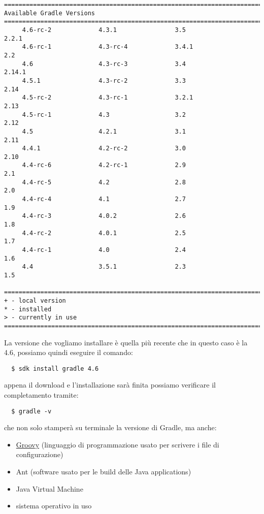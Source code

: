 \begin{verbatim}
================================================================================
Available Gradle Versions
================================================================================
     4.6-rc-2             4.3.1                3.5                  2.2.1          
     4.6-rc-1             4.3-rc-4             3.4.1                2.2            
     4.6                  4.3-rc-3             3.4                  2.14.1         
     4.5.1                4.3-rc-2             3.3                  2.14           
     4.5-rc-2             4.3-rc-1             3.2.1                2.13           
     4.5-rc-1             4.3                  3.2                  2.12           
     4.5                  4.2.1                3.1                  2.11           
     4.4.1                4.2-rc-2             3.0                  2.10           
     4.4-rc-6             4.2-rc-1             2.9                  2.1            
     4.4-rc-5             4.2                  2.8                  2.0            
     4.4-rc-4             4.1                  2.7                  1.9            
     4.4-rc-3             4.0.2                2.6                  1.8            
     4.4-rc-2             4.0.1                2.5                  1.7            
     4.4-rc-1             4.0                  2.4                  1.6            
     4.4                  3.5.1                2.3                  1.5            

================================================================================
+ - local version
* - installed
> - currently in use
================================================================================ \end{verbatim}
La versione che vogliamo installare è quella più recente che in questo caso è la 4.6, possiamo quindi eseguire il comando:
\begin{verbatim}
  $ sdk install gradle 4.6 \end{verbatim}
appena il download e l'installazione sarà finita possiamo verificare il completamento tramite:
\begin{verbatim}
  $ gradle -v \end{verbatim}
che non solo stamperà su terminale la versione di Gradle, ma anche:
\begin{itemize}
  \item \href{http://www.groovy-lang.org/}{Groovy} (linguaggio di programmazione usato per scrivere i file di configurazione)
  \item Ant (software usato per le build delle Java applications)
  \item Java Virtual Machine
  \item sistema operativo in uso
\end{itemize}
